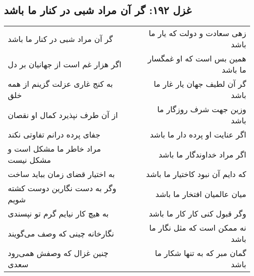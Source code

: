 \begin{center}
\section*{غزل ۱۹۲: گر آن مراد شبی در کنار ما باشد}
\label{sec:192}
\begin{longtable}{l p{0.5cm} r}
گر آن مراد شبی در کنار ما باشد
&&
زهی سعادت و دولت که یار ما باشد
\\
اگر هزار غم است از جهانیان بر دل
&&
همین بس است که او غمگسار ما باشد
\\
به کنج غاری عزلت گزینم از همه خلق
&&
گر آن لطیف جهان یار غار ما باشد
\\
از آن طرف نپذیرد کمال او نقصان
&&
وزین جهت شرف روزگار ما باشد
\\
جفای پرده درانم تفاوتی نکند
&&
اگر عنایت او پرده دار ما باشد
\\
مراد خاطر ما مشکل است و مشکل نیست
&&
اگر مراد خداوندگار ما باشد
\\
به اختیار قضای زمان بباید ساخت
&&
که دایم آن نبود کاختیار ما باشد
\\
وگر به دست نگارین دوست کشته شویم
&&
میان عالمیان افتخار ما باشد
\\
به هیچ کار نیایم گرم تو نپسندی
&&
وگر قبول کنی کار کار ما باشد
\\
نگارخانه چینی که وصف می‌گویند
&&
نه ممکن است که مثل نگار ما باشد
\\
چنین غزال که وصفش همی‌رود سعدی
&&
گمان مبر که به تنها شکار ما باشد
\\
\end{longtable}
\end{center}
